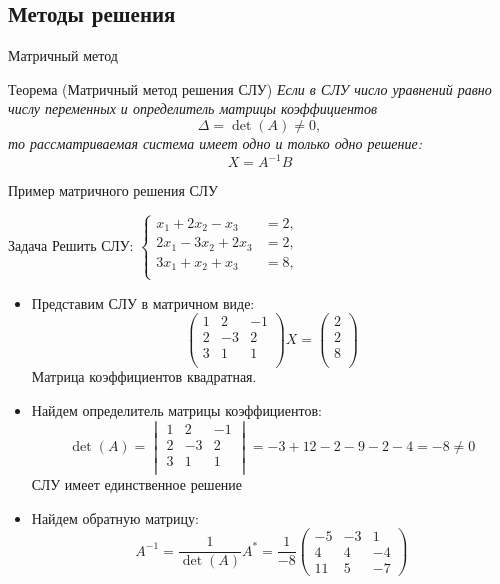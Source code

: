 \documentclass[unicode,11pt,notheorems]{beamer}
\begin{document}
\subsection{Методы решения}
\begin{frame}{Матричный метод}
\begin{block}{Теорема (Матричный метод решения СЛУ)}
\itshape  Если в СЛУ число уравнений равно числу переменных и определитель матрицы коэффициентов 
$$
\Delta=\det(A)\neq 0,
$$
то рассматриваемая система имеет одно и только одно решение:
	$$
		X=A^{-1}B
	$$
\end{block}
\end{frame}
\begin{frame}[allowframebreaks]{Пример матричного решения СЛУ}
	\begin{exampleblock}{Задача}
		Решить СЛУ: 
		$
		\left\lbrace
		\begin{aligned}
			x_1+2x_2-x_3 &= 2,\\
			2x_1-3x_2+2x_3 &= 2,\\
			3x_1+x_2+x_3 &= 8,\\
		\end{aligned}
		\right.
		$
	\end{exampleblock}
	\begin{itemize}
	\item 
		Представим СЛУ в матричном виде:
		$$
			\begin{pmatrix}
				 1 & 2& -1\\
				 2 & -3& 2\\
				 3 & 1& 1\\
			\end{pmatrix}
			X = 
			\begin{pmatrix}
				 2\\
				 2\\
				 8\\
			\end{pmatrix}
		$$
		Матрица коэффициентов квадратная.
	\item 
		 Найдем определитель матрицы коэффициентов:
		$$
			\det(A)= 
			\begin{vmatrix}
				 1 & 2& -1\\
				 2 & -3& 2\\
				 3 & 1& 1\\
			\end{vmatrix}
			 = -3+12-2-9-2-4=-8 \neq 0
		$$
	СЛУ имеет единственное решение
	\item 
		 Найдем обратную матрицу:	
		$$
			A^{-1}= \frac{1}{\det(A)}A^*= \frac{1}{-8}
			\begin{pmatrix}
				-5 & -3 & 1\\
				4 & 4 & -4\\
				11 & 5 & -7
			\end{pmatrix}
		$$


\end{itemize}
\end{frame}
\end{document}
